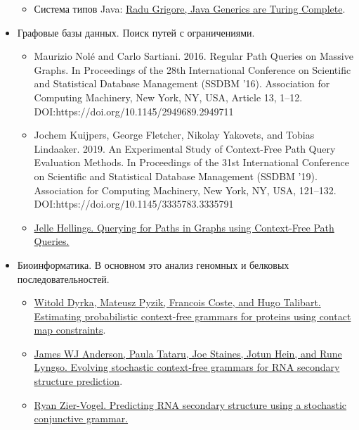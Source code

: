\begin{itemize}
\begin{itemize}
    \item Система типов Java: \href{https://arxiv.org/abs/1605.05274}{Radu Grigore, Java Generics are Turing Complete}.
  \end{itemize}

  \item Графовые базы данных. Поиск путей с ограничениями.
    \begin{itemize}
      \item Maurizio Nolé and Carlo Sartiani. 2016. Regular Path Queries on Massive Graphs. In Proceedings of the 28th International Conference on Scientific and Statistical Database Management (SSDBM ’16). Association for Computing Machinery, New York, NY, USA, Article 13, 1–12. DOI:https://doi.org/10.1145/2949689.2949711
      \item Jochem Kuijpers, George Fletcher, Nikolay Yakovets, and Tobias Lindaaker. 2019. An Experimental Study of Context-Free Path Query Evaluation Methods. In Proceedings of the 31st International Conference on Scientific and Statistical Database Management (SSDBM ’19). Association for Computing Machinery, New York, NY, USA, 121–132. DOI:https://doi.org/10.1145/3335783.3335791
      \item \href{https://arxiv.org/abs/1502.02242}{Jelle Hellings. Querying for Paths in Graphs using Context-Free Path Queries.}
    \end{itemize}

  \item Биоинформатика. В основном это анализ геномных и белковых последовательностей.
    \begin{itemize}
      \item \href{https://www.ncbi.nlm.nih.gov/pmc/articles/PMC6428041/}{Witold Dyrka, Mateusz Pyzik, Francois Coste, and Hugo Talibart. Estimating probabilistic context-free grammars for proteins using contact map constraints}.
      \item \href{https://www.ncbi.nlm.nih.gov/pmc/articles/PMC3464655/}{James WJ Anderson, Paula Tataru, Joe Staines, Jotun Hein, and Rune Lyngso. Evolving stochastic context-free grammars for RNA secondary structure prediction}.
      \item \href{https://www.semanticscholar.org/paper/Predicting-RNA-secondary-structure-using-a-grammar-Zier-Vogel/90bb312cb1a0f61eddb7a8b5b782bb40630894dd}{Ryan Zier-Vogel. Predicting RNA secondary structure using a stochastic conjunctive grammar.}
    \end{itemize}


\end{itemize}
